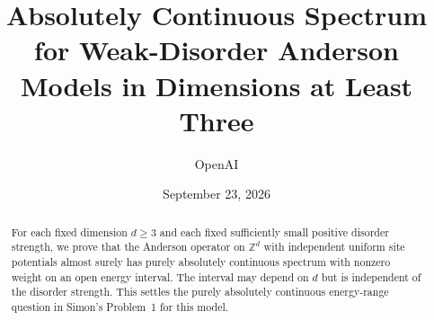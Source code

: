 \documentclass[11pt,a4paper]{article}
\title{Absolutely Continuous Spectrum for Weak-Disorder Anderson Models in Dimensions at Least Three}
\author{OpenAI}
\date{September 23, 2026}
\theoremstyle{definition}
\theoremstyle{remark}
\begin{document}
\maketitle
\begin{abstract}
For each fixed dimension $d\ge3$ and each fixed sufficiently small positive
disorder strength, we prove that the Anderson operator on $\mathbb Z^d$ with
independent uniform site potentials almost surely has purely absolutely
continuous spectrum with nonzero weight on an open energy interval. The
interval may depend on $d$ but is independent of the disorder strength.
This settles the purely absolutely continuous energy-range question in
Simon's Problem~1 for this model.
\end{abstract}
\tableofcontents











\end{document}
